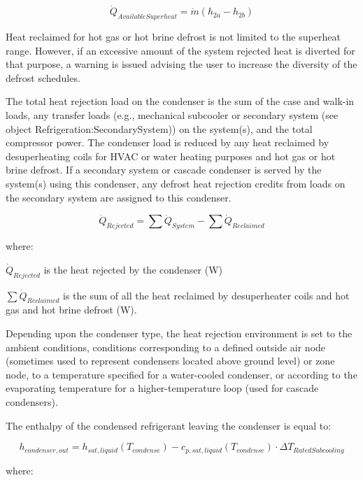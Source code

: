 \begin{equation}
{\dot Q_{AvailableSuperheat}} = \dot m \left( {{h_{2a}} - {h_{2b}}} \right)
\end{equation}

Heat reclaimed for hot gas or hot brine defrost is not limited to the superheat range. However, if an excessive amount of the system rejected heat is diverted for that purpose, a warning is issued advising the user to increase the diversity of the defrost schedules.

The total heat rejection load on the condenser is the sum of the case and walk-in loads, any transfer loads (e.g., mechanical subcooler or secondary system (see object Refrigeration:SecondarySystem)) on the system(s), and the total compressor power. The condenser load is reduced by any heat reclaimed by desuperheating coils for HVAC or water heating purposes and hot gas or hot brine defrost. If a secondary system or cascade condenser is served by the system(s) using this condenser, any defrost heat rejection credits from loads on the secondary system are assigned to this condenser.

\begin{equation}
{\dot Q_{Rejected}} = \sum {{{\dot Q}_{System}}}  - \sum {{{\dot Q}_{Reclaimed}}}
\end{equation}

where:

\(\dot{Q}_{Rejected}\) is the heat rejected by the condenser (W)

\(\sum {{{\dot Q}_{Reclaimed}}}\) is the sum of all the heat reclaimed by desuperheater coils and hot gas and hot brine defrost (W).

Depending upon the condenser type, the heat rejection environment is set to the ambient conditions, conditions corresponding to a defined outside air node (sometimes used to represent condensers located above ground level) or zone node, to a temperature specified for a water-cooled condenser, or according to the evaporating temperature for a higher-temperature loop (used for cascade condensers).

The enthalpy of the condensed refrigerant leaving the condenser is equal to:

\begin{equation}
{h_{condenser,out}} = {h_{sat,liquid}}({T_{condense}}) - {c_{p,sat,liquid}}({T_{condense}}) \cdot \Delta {T_{RatedSubcooling}}
\end{equation}

where:

